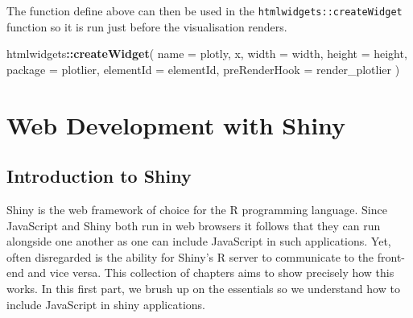 \documentclass[
]{krantz}
\makeatletter
\newenvironment{Shaded}{\begin{snugshade}}{\end{snugshade}}
\newcommand{\ControlFlowTok}[1]{\textcolor[rgb]{0.27,0.27,0.27}{\textbf{#1}}}
\newcommand{\DataTypeTok}[1]{\textcolor[rgb]{0.27,0.27,0.27}{#1}}
\newcommand{\KeywordTok}[1]{\textcolor[rgb]{0.27,0.27,0.27}{\textbf{#1}}}
\newcommand{\NormalTok}[1]{#1}
\newcommand{\OperatorTok}[1]{\textcolor[rgb]{0.43,0.43,0.43}{\textbf{#1}}}
\newcommand{\OtherTok}[1]{\textcolor[rgb]{0.37,0.37,0.37}{#1}}
\newcommand{\StringTok}[1]{\textcolor[rgb]{0.5,0.5,0.5}{#1}}
\newenvironment{kframe}{%
\medskip{}
\setlength{\fboxsep}{.8em}
 \def\at@end@of@kframe{}%
 \ifinner\ifhmode%
  \def\at@end@of@kframe{\end{minipage}}%
  \begin{minipage}{\columnwidth}%
 \fi\fi%
 \def\FrameCommand##1{\hskip\@totalleftmargin \hskip-\fboxsep
 \colorbox{shadecolor}{##1}\hskip-\fboxsep
     \hskip-\linewidth \hskip-\@totalleftmargin \hskip\columnwidth}%
 \MakeFramed {\advance\hsize-\width
   \@totalleftmargin\z@ \linewidth\hsize
   \@setminipage}}%
 {\par\unskip\endMakeFramed%
 \at@end@of@kframe}
\renewenvironment{Shaded}{\begin{kframe}}{\end{kframe}}
\makeatother
\begin{document}
\begin{Shaded}
\end{Shaded}

The function define above can then be used in the \texttt{htmlwidgets::createWidget} function so it is run just before the visualisation renders.

\begin{Shaded}
\begin{Highlighting}[]
\NormalTok{htmlwidgets}\OperatorTok{::}\KeywordTok{createWidget}\NormalTok{(}
  \DataTypeTok{name =} \StringTok{\textquotesingle{}plotly\textquotesingle{}}\NormalTok{,}
\NormalTok{  x,}
  \DataTypeTok{width =}\NormalTok{ width,}
  \DataTypeTok{height =}\NormalTok{ height,}
  \DataTypeTok{package =} \StringTok{\textquotesingle{}plotlier\textquotesingle{}}\NormalTok{,}
  \DataTypeTok{elementId =}\NormalTok{ elementId,}
  \DataTypeTok{preRenderHook =}\NormalTok{ render\_plotlier}
\NormalTok{)}
\end{Highlighting}
\end{Shaded}

\hypertarget{part-web-development-with-shiny}{%
\part{Web Development with Shiny}\label{part-web-development-with-shiny}}

\hypertarget{shiny-intro}{%
\chapter{Introduction to Shiny}\label{shiny-intro}}

Shiny is the web framework of choice for the R programming language. Since JavaScript and Shiny both run in web browsers it follows that they can run alongside one another as one can include JavaScript in such applications. Yet, often disregarded is the ability for Shiny's R server to communicate to the front-end and vice versa. This collection of chapters aims to show precisely how this works. In this first part, we brush up on the essentials so we understand how to include JavaScript in shiny applications.
\end{document}
